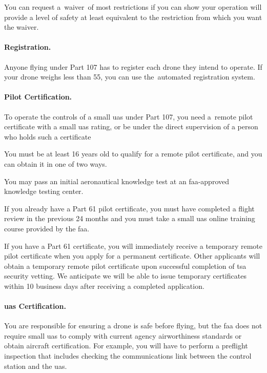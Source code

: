 You can request a waiver of most restrictions if you can show your operation will provide a level of safety at least equivalent to the restriction from which you want the waiver.

\paragraph{Registration.}
Anyone flying under Part 107 has to register each drone they intend to operate. If your drone weighs less than \SI{55}{\poundm}, you can use the automated registration system.

\paragraph{Pilot Certification.}
To operate the controls of a small \gls{uas} under Part 107, you need a remote pilot certificate with a small \gls{uas} rating, or be under the direct supervision of a person who holds such a certificate

You must be at least 16 years old to qualify for a remote pilot certificate, and you can obtain it in one of two ways.

You may pass an initial aeronautical knowledge test at an \gls{faa}-approved knowledge testing center.

If you already have a Part 61 pilot certificate, you must have completed a flight review in the previous 24 months and you must take a small \gls{uas} online training course provided by the \gls{faa}.

If you have a Part 61 certificate, you will immediately receive a temporary remote pilot certificate when you apply for a permanent certificate. Other applicants will obtain a temporary remote pilot certificate upon successful completion of \gls{tsa} security vetting. We anticipate we will be able to issue temporary certificates within 10 business days after receiving a completed application.

\paragraph{\gls{uas} Certification.}
You are responsible for ensuring a drone is safe before flying, but the \gls{faa} does not require small \gls{uas} to comply with current agency airworthiness standards or obtain aircraft certification. For example, you will have to perform a preflight inspection that includes checking the communications link between the control station and the \gls{uas}.

